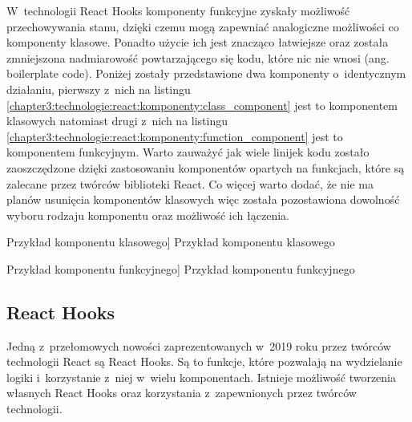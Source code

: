 \documentclass[../Kamil_Kowalewski_Main.tex]{subfiles}
\begin{document}
{{{            W~technologii React Hooks komponenty funkcyjne zyskały możliwość
            przechowywania stanu, dzięki czemu mogą zapewniać analogiczne możliwości co
            komponenty klasowe. Ponadto użycie ich jest znacząco łatwiejsze oraz
            została zmniejszona nadmiarowość powtarzającego się kodu, które nic nie
            wnosi (ang. boilerplate code). Poniżej zostały przedstawione dwa komponenty
            o~identycznym działaniu, pierwszy z~nich na listingu
            \ref{chapter3:technologie:react:komponenty:class_component} jest to komponentem
            klasowych natomiast drugi z~nich na listingu
            \ref{chapter3:technologie:react:komponenty:function_component}
            jest to komponentem funkcyjnym. Warto zauważyć jak
            wiele linijek kodu zostało zaoszczędzone dzięki zastosowaniu komponentów
            opartych na funkcjach, które są zalecane przez twórców biblioteki React. Co
            więcej warto dodać, że nie ma planów usunięcia komponentów klasowych więc
            została pozostawiona dowolność wyboru rodzaju komponentu oraz możliwość ich łączenia.

            \begin{code}[H]
                
                \caption
                [Przykład komponentu klasowego]
                {Przykład komponentu klasowego}
                \label{chapter3:technologie:react:komponenty:class_component}
            \end{code}

            \begin{code}[H]
                
                \caption
                [Przykład komponentu funkcyjnego]
                {Przykład komponentu funkcyjnego}
                \label{chapter3:technologie:react:komponenty:function_component}
            \end{code}
        }

        \subsection{React Hooks}
        \label{chapter3:technologie:react:hooks} {
            Jedną z~przełomowych nowości zaprezentowanych w~2019 roku przez twórców
            technologii React są React Hooks. Są to funkcje, które pozwalają na
            wydzielanie logiki i~korzystanie z~niej w~wielu komponentach. Istnieje
            możliwość tworzenia własnych React Hooks oraz korzystania z~zapewnionych przez
            twórców technologii.

}}}
\end{document}
